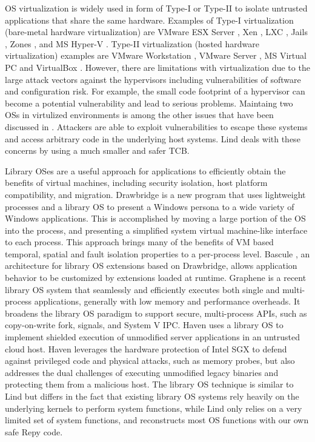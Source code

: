 OS virtualization is widely used in form of Type-I or Type-II to isolate untrusted applications that share the same hardware. Examples of Type-I virtualization (bare-metal hardware virtualization) are VMware ESX Server \cite{VMWare-ESX-Server}, Xen \cite{Xen-03}, LXC \cite{LXC}, Jails \cite{Jails}, Zones \cite{Zones}, and MS Hyper-V \cite{Microsoft-Hyper-V}. Type-II virtualization (hosted hardware virtualization) examples are VMware Workstation \cite{VMWare-Workstation}, VMware Server \cite{VMWare-Server}, MS Virtual PC \cite{Microsoft-Virtual-PC} and VirtualBox \cite{VirtualBox}.  However, there are limitations with virtualization due to the large attack vectors against the hypervisors including vulnerabilities of software and configuration risk. For example, the small code footprint of a hypervisor can become a potential vulnerability and lead to serious problems. Maintaing two OSs in virtulized environments is among the other issues that have been discussed in \cite{Virt-Issues}. Attackers are able to exploit vulnerabilities to escape these systems and access arbitrary code in the underlying host systems. Lind deals with these concerns by using a much smaller and safer TCB.

Library OSes are a useful approach for applications to efficiently obtain the benefits of virtual machines, 
including security isolation, host platform compatibility, and migration. Drawbridge \cite{Drawbridge-11} is a new program 
that uses lightweight processes and a library OS to present a Windows persona to a wide variety of Windows applications. 
This is accomplished by moving a large portion of the OS into the process, and presenting a simplified system 
virtual machine-like interface to each process. This approach brings many of the benefits of VM based temporal, 
spatial and fault isolation properties to a per-process level. Bascule \cite{Bascule}, an architecture for library OS extensions 
based on Drawbridge, allows application behavior to be customized by extensions loaded at runtime. 
Graphene \cite{Graphene-14} is a recent library OS system that seamlessly and efficiently executes both single and 
multi-process applications, generally with low memory and performance overheads. 
It broadens the library OS paradigm to support secure, multi-process APIs, such as copy-on-write fork, signals, 
and System V IPC. Haven \cite{Haven} uses a library OS to implement shielded execution of unmodified server applications 
in an untrusted cloud host. Haven leverages the hardware protection of Intel SGX to defend against 
privileged code and physical attacks, such as memory probes, but also addresses the dual challenges of 
executing unmodified legacy binaries and protecting them from a malicious host. 
The library OS technique is similar to Lind but differs in the fact that existing library OS systems rely heavily on 
the underlying kernels to perform system functions, while Lind only relies on a very limited set of system functions, 
and reconstructs most OS functions with our own safe Repy code. 

